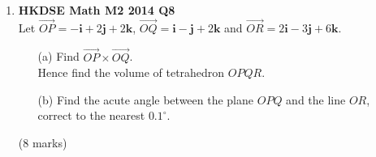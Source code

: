 \documentclass{report}
\begin{document}
\begin{enumerate}
	\newpage

	\item \textbf{HKDSE Math M2 2014 Q8}\\
	Let 
	$\overrightarrow{OP} = -\textbf{i} +2 \textbf{j} +2\textbf {k}$, 
	$\overrightarrow{OQ} = \textbf{i} - \textbf{j} +2\textbf {k}$ and 
	$\overrightarrow{OR} = 2\textbf{i} -3 \textbf{j} +6\textbf {k}$. 
	\begin{enumerate}
		\item [(a)]Find $\overrightarrow{OP} \times \overrightarrow{OQ}$. \\
		Hence find the volume of tetrahedron $OPQR$. 
		\item [(b)]Find the acute angle between the plane $OPQ$ and the line $OR$, \\
		correct to the nearest $0.1^\circ$.
	\end{enumerate}
	(8 marks)


\end{enumerate}
\end{document}
